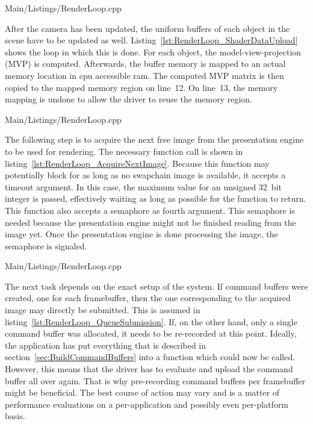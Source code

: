     
    {Main/Listings/RenderLoop.cpp}

    After the camera has been updated, the uniform buffers of each object in the scene have to be updated as well.
    Listing~\ref{lst:RenderLoop_ShaderDataUpload} shows the loop in which this is done.
    For each object, the model-view-projection (MVP) is computed.
    Afterwards, the buffer memory is mapped to an actual memory location in \gls{cpu} accessible \gls{ram}.
    The computed MVP matrix is then copied to the mapped memory region on line~12.
    On line~13, the memory mapping is undone to allow the \gls{driver} to reuse the memory region.

    
    {Main/Listings/RenderLoop.cpp}

    The following step is to acquire the next free image from the presentation engine to be used for rendering.
    The necessary function call is shown in listing~\ref{lst:RenderLoop_AcquireNextImage}.
    Because this function may potentially block for as long as no swapchain image is available, it accepts a timeout argument.
    In this case, the maximum value for an unsigned 32~bit integer is passed, effectively waiting as long as possible for the function to return.
    This function also accepts a semaphore as fourth argument.
    This semaphore is needed because the presentation engine might not be finished reading from the image yet.
    Once the presentation engine is done processing the image, the semaphore is signaled.

    
    {Main/Listings/RenderLoop.cpp}

    The next task depends on the exact setup of the system.
    If command buffers were created, one for each framebuffer, then the one corresponding to the acquired image may directly be submitted.
    This is assumed in listing~\ref{lst:RenderLoop_QueueSubmission}.
    If, on the other hand, only a single command buffer was allocated, it needs to be re-recorded at this point.
    Ideally, the application has put everything that is described in section~\ref{sec:BuildCommandBuffers} into a function which could now be called.
    However, this means that the \gls{driver} has to evaluate and upload the command buffer all over again.
    That is why pre-recording command buffers per framebuffer might be beneficial.
    The best course of action may vary and is a matter of performance evaluations on a per-application and possibly even per-platform basis.

